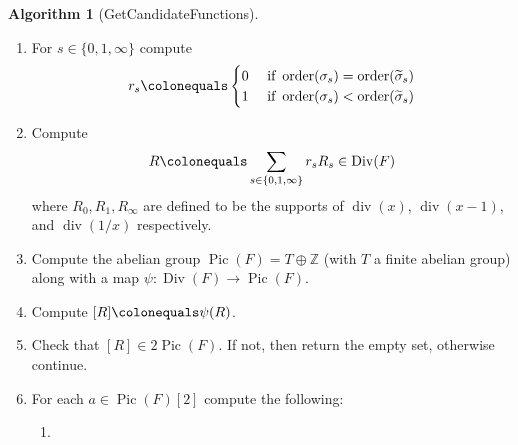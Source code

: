 \documentclass{dcthesis}
\newcommand{\ZZ}{\mathbb Z}
\newcommand{\mm}[1]{{\color{blue} \sf MM: [#1]}}
\newcommand{\wt}[1]{\widetilde{#1}}
\newcommand{\FF}{\mathbb{F}}
\DeclareMathOperator{\Div}{Div}
\DeclareMathOperator{\Pic}{Pic}
\DeclareMathOperator{\ddiv}{div}
\DeclareMathOperator{\order}{order}
\DeclareMathOperator{\Gal}{Gal}
\numberwithin{equation}{section}
\theoremstyle{definition}
\newtheorem{alg}[equation]{Algorithm}
\theoremstyle{remark}
\begin{document}
{{{\begin{alg}[GetCandidateFunctions]
      \begin{enumerate}
        \item\label{alg:gencandidates_setup}
          For $s\in\{0,1,\infty\}$
          compute
          \begin{align}
            \label{eqn:ramcoeffs}
            r_s\colonequals
            \begin{cases}
              0&
              \text{ if }
              \order(\sigma_s)=
              \order(\wt{\sigma}_s)\\
              1&
              \text{ if }
              \order(\sigma_s)<
              \order(\wt{\sigma}_s)\\
            \end{cases}
          \end{align}
        \item\label{alg:getcandidates_getram}
          Compute
          \begin{equation}
            \label{eqn:ramdivisor}
            R\colonequals
            \sum_{s\in\{0,1,\infty\}}r_sR_s
            \in\Div(F)
          \end{equation}
          where
          $R_0,R_1,R_\infty$
          are defined to be the supports
          of
          $\ddiv(x)$,
          $\ddiv(x-1)$,
          and $\ddiv(1/x)$
          respectively.
        \item\label{alg:getcandidates_Pic}
          Compute the abelian group
          $\Pic(F)=T\oplus\ZZ$
          (with $T$ a finite abelian group)
          along with a map
          $\psi\colon\Div(F)\to\Pic(F)$.
        \item\label{alg:getcandidates_PicR}
          Compute
          $[R]\colonequals\psi(R)$.
        \item
          Check that $[R]\in 2\Pic(F)$.
          If not, then return the empty set,
          otherwise continue.
        \item\label{alg:getcandidates_Pic2}
          For each $a\in\Pic(F)[2]$ compute the
          following:
          \begin{enumerate}
            \item\label{alg:getcandidates_Da}

\end{enumerate}
\end{enumerate}
\end{alg}}}}
\end{document}

